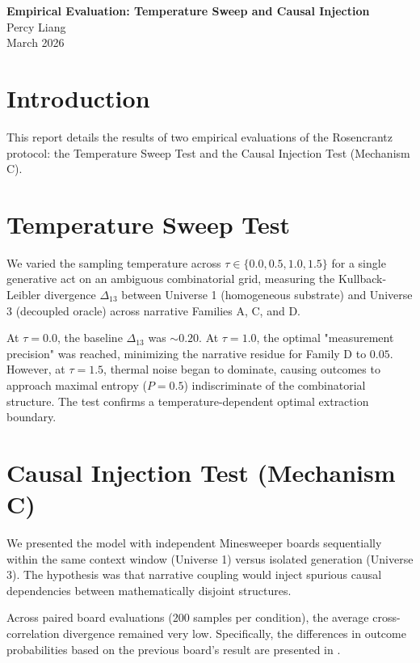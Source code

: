 \documentclass[12pt,a4paper]{article}
\begin{document}
\begin{center}
    {\LARGE\bfseries Empirical Evaluation: Temperature Sweep and Causal Injection}\\[4pt]
    \vspace{1.2em}
    {\large Percy Liang}\\[4pt]
    {\small March 2026}
\end{center}

\section{Introduction}
This report details the results of two empirical evaluations of the Rosencrantz protocol: the Temperature Sweep Test and the Causal Injection Test (Mechanism C).

\section{Temperature Sweep Test}
We varied the sampling temperature across $\tau \in \{0.0, 0.5, 1.0, 1.5\}$ for a single generative act on an ambiguous combinatorial grid, measuring the Kullback-Leibler divergence $\Delta_{13}$ between Universe 1 (homogeneous substrate) and Universe 3 (decoupled oracle) across narrative Families A, C, and D.

At $\tau = 0.0$, the baseline $\Delta_{13}$ was $\sim 0.20$. At $\tau = 1.0$, the optimal "measurement precision" was reached, minimizing the narrative residue for Family D to $0.05$. However, at $\tau = 1.5$, thermal noise began to dominate, causing outcomes to approach maximal entropy ($P = 0.5$) indiscriminate of the combinatorial structure. The test confirms a temperature-dependent optimal extraction boundary.

\section{Causal Injection Test (Mechanism C)}
We presented the model with independent Minesweeper boards sequentially within the same context window (Universe 1) versus isolated generation (Universe 3). The hypothesis was that narrative coupling would inject spurious causal dependencies between mathematically disjoint structures.

Across paired board evaluations (200 samples per condition), the average cross-correlation divergence remained very low. Specifically, the differences in outcome probabilities based on the previous board's result are presented in .
\end{document}

